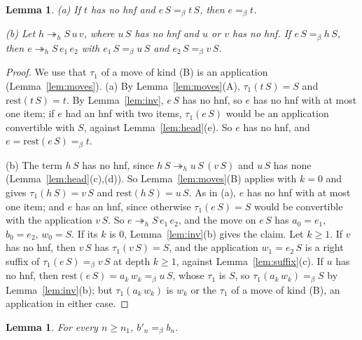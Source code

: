 \documentclass[11pt]{amsart}
\newtheorem{lemma}[theorem]{Lemma}
\theoremstyle{definition}
\newcommand{\hred}{\twoheadrightarrow_h}
\newcommand{\conv}{=_\beta}
\newcommand{\rest}{\mathrm{rest}}
\begin{document}
\begin{lemma}\label{lem:cancel}
\textup{(a)} If $t$ has no hnf and $e\,S\conv t\,S$, then $e\conv t$.

\textup{(b)} Let $h\hred S\,u\,v$, where $u\,S$ has no hnf and $u$ or $v$ has no hnf. If
$e\,S\conv h\,S$, then $e\hred S\,e_1\,e_2$ with $e_1\,S\conv u\,S$ and $e_2\,S\conv v\,S$.
\end{lemma}

\begin{proof}
We use that $\tau_1$ of a move of kind (B) is an application (Lemma~\ref{lem:moves}).
(a) By Lemma~\ref{lem:moves}(A), $\tau_1(t\,S)=S$ and $\rest(t\,S)=t$. By Lemma~\ref{lem:inv},
$e\,S$ has no hnf, so $e$ has no hnf with at most one item; if $e$ had an hnf with two items, $\tau_1(e\,S)$
would be an application convertible with $S$, against Lemma~\ref{lem:head}(e). So $e$ has no hnf, and
$e=\rest(e\,S)\conv t$.

(b) The term $h\,S$ has no hnf, since $h\,S\hred u\,S\,(v\,S)$ and $u\,S$ has none
(Lemma~\ref{lem:head}(c),(d)). So Lemma~\ref{lem:moves}(B) applies with $k=0$ and gives
$\tau_1(h\,S)=v\,S$ and $\rest(h\,S)=u\,S$. As in (a),
$e$ has no hnf with at most one item; and $e$ has an hnf, since otherwise $\tau_1(e\,S)=S$ would be
convertible with the application $v\,S$. So $e\hred S\,e_1\,e_2$, and the move on $e\,S$
has $a_0=e_1$, $b_0=e_2$, $w_0=S$. If its $k$ is $0$, Lemma~\ref{lem:inv}(b) gives the claim. Let
$k\ge1$. If $v$ has no hnf, then $v\,S$ has $\tau_1(v\,S)=S$, and the application $w_1=e_2\,S$ is a
right suffix of $\tau_1(e\,S)\conv v\,S$ at depth $k\ge1$, against Lemma~\ref{lem:suffix}(c). If $u$
has no hnf, then $\rest(e\,S)=a_k\,w_k\conv u\,S$, whose $\tau_1$ is $S$, so
$\tau_1(a_k\,w_k)\conv S$ by Lemma~\ref{lem:inv}(b); but $\tau_1(a_k\,w_k)$ is $w_k$ or the $\tau_1$ of a
move of kind (B), an application in either case.
\end{proof}

\begin{lemma}\label{lem:left}
For every $n\ge n_1$, $b'_n\conv b_n$.
\end{lemma}
\end{document}
